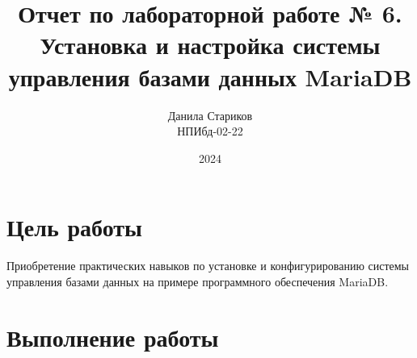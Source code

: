 

\title{Отчет по лабораторной работе № 6. \\ Установка и настройка системы управления базами данных MariaDB} 
\author{Данила Стариков \\ НПИбд-02-22}
\date{2024}



\maketitle
\newpage

\tableofcontents

\newpage
\section{Цель работы}
Приобретение практических навыков по установке и конфигурированию системы управления базами данных на примере программного обеспечения MariaDB. \newpage
\section{Выполнение работы}
